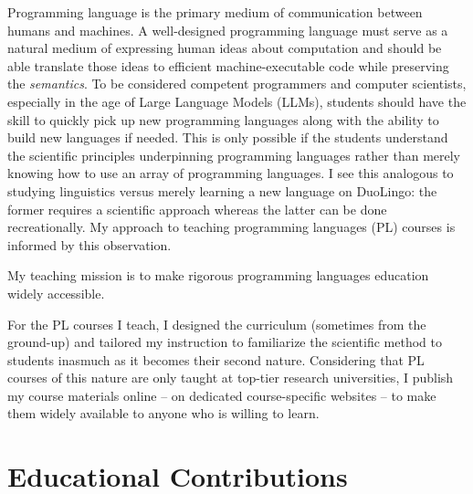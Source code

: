 
Programming language is the primary medium of
communication between humans and machines. A well-designed programming
language must serve as a natural medium of expressing human ideas about
computation and should be able translate those ideas to efficient
machine-executable code while preserving the \emph{semantics}. To be
considered competent programmers and computer scientists, especially in the
age of Large Language Models (LLMs), students should have the skill to
quickly pick up new programming languages along with the ability to build
new languages if needed. This is only possible if the students understand
the scientific principles underpinning programming languages rather than
merely knowing how to use an array of programming languages. I see this
analogous to studying linguistics versus merely learning a new language on
DuoLingo: the former requires a scientific approach whereas the latter can
be done recreationally. My approach to teaching programming languages (PL)
courses is informed by this observation. 
\begin{mdquote} 
My teaching mission is to make rigorous programming languages education
widely accessible. 
\end{mdquote}
\noindent For the PL courses I teach, I designed the curriculum (sometimes
from the ground-up) and tailored my instruction to familiarize the
scientific method to students inasmuch as it becomes their second nature.
Considering that PL courses of this nature are only taught at top-tier
research universities, I publish my course materials online -- on dedicated
course-specific websites -- to make them widely available to anyone who is
willing to learn.

\section*{Educational Contributions}

